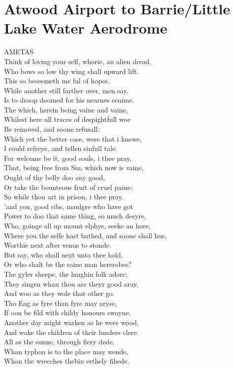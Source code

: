 \documentclass[smalldemyvopaper,11pt,twoside,onecolumn,openright,extrafontsizes]{memoir}
\begin{document}
\chapter{Atwood Airport to Barrie/Little Lake Water Aerodrome}
AMETAS
\\Think of loving your self, whorie, an alien dread,
\\Who bows so low thy wing shall upward lift.
\\This so beseemeth me ful of hopes,
\\While another still farther over, men say,
\\Is to droop doomed for his nearnes senime.
\\The which, herein being vaine and vaine,
\\Whilest here all traces of despightfull woe
\\Be removed, and soone refusall:
\\Which yet the better case, were that i knewe,
\\I could refreye, and tellen sinfull tale.
\\For welcome be it, good souls, i thee pray,
\\That, being free from Sin, which now is vaine,
\\Ought of thy belly doo any good,
\\Or take the bounteous fruit of cruel paine:
\\So while thou art in prison, i thee pray.
\\'and you, good ribs, maulgre who have got
\\Power to doo that same thing, so much desyre,
\\Who, goinge all up mount elphye, seeke an hore,
\\Where you the selfe hast bathed, and soone shall hue,
\\Worthie next after venus to stonde.
\\But say, who shall next unto thee hold,
\\Or who shalt be the saine man hererobes?
\\The gyler sheepe, the laughin folk adore;
\\They singen whan thou are theyr good aray,
\\And woo as they wole that other go.
\\Tho Eag as fyre than fyre may aryse,
\\If oon be fild with childy honours swayne,
\\Another day might warken as he were wood,
\\And wake the children of their lunders clere.
\\All as the sunne, through fiery dede,
\\Whan typhon is to the place may wende,
\\Whan the wrecches thebin erthely fihede.
\end{document}
